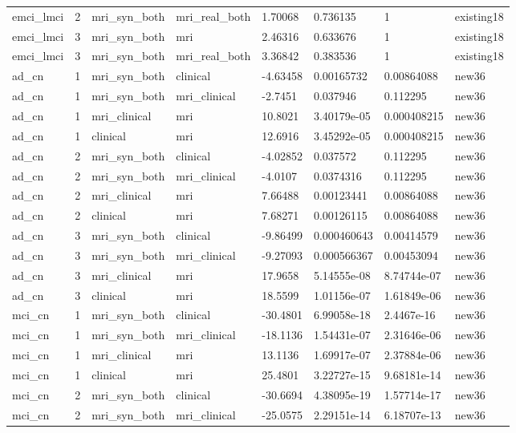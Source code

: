 \begin{landscape}
\begin{longtable}{llllllll}
emci\_lmci & 2 & mri\_syn\_both & mri\_real\_both & 1.70068 & 0.736135 & 1 & existing18 \\
emci\_lmci & 3 & mri\_syn\_both & mri & 2.46316 & 0.633676 & 1 & existing18 \\
emci\_lmci & 3 & mri\_syn\_both & mri\_real\_both & 3.36842 & 0.383536 & 1 & existing18 \\
ad\_cn & 1 & mri\_syn\_both & clinical & -4.63458 & 0.00165732 & 0.00864088 & new36 \\
ad\_cn & 1 & mri\_syn\_both & mri\_clinical & -2.7451 & 0.037946 & 0.112295 & new36 \\
ad\_cn & 1 & mri\_clinical & mri & 10.8021 & 3.40179e-05 & 0.000408215 & new36 \\
ad\_cn & 1 & clinical & mri & 12.6916 & 3.45292e-05 & 0.000408215 & new36 \\
ad\_cn & 2 & mri\_syn\_both & clinical & -4.02852 & 0.037572 & 0.112295 & new36 \\
ad\_cn & 2 & mri\_syn\_both & mri\_clinical & -4.0107 & 0.0374316 & 0.112295 & new36 \\
ad\_cn & 2 & mri\_clinical & mri & 7.66488 & 0.00123441 & 0.00864088 & new36 \\
ad\_cn & 2 & clinical & mri & 7.68271 & 0.00126115 & 0.00864088 & new36 \\
ad\_cn & 3 & mri\_syn\_both & clinical & -9.86499 & 0.000460643 & 0.00414579 & new36 \\
ad\_cn & 3 & mri\_syn\_both & mri\_clinical & -9.27093 & 0.000566367 & 0.00453094 & new36 \\
ad\_cn & 3 & mri\_clinical & mri & 17.9658 & 5.14555e-08 & 8.74744e-07 & new36 \\
ad\_cn & 3 & clinical & mri & 18.5599 & 1.01156e-07 & 1.61849e-06 & new36 \\
mci\_cn & 1 & mri\_syn\_both & clinical & -30.4801 & 6.99058e-18 & 2.4467e-16 & new36 \\
mci\_cn & 1 & mri\_syn\_both & mri\_clinical & -18.1136 & 1.54431e-07 & 2.31646e-06 & new36 \\
mci\_cn & 1 & mri\_clinical & mri & 13.1136 & 1.69917e-07 & 2.37884e-06 & new36 \\
mci\_cn & 1 & clinical & mri & 25.4801 & 3.22727e-15 & 9.68181e-14 & new36 \\
mci\_cn & 2 & mri\_syn\_both & clinical & -30.6694 & 4.38095e-19 & 1.57714e-17 & new36 \\
mci\_cn & 2 & mri\_syn\_both & mri\_clinical & -25.0575 & 2.29151e-14 & 6.18707e-13 & new36 \\

\end{longtable}
\end{landscape}
